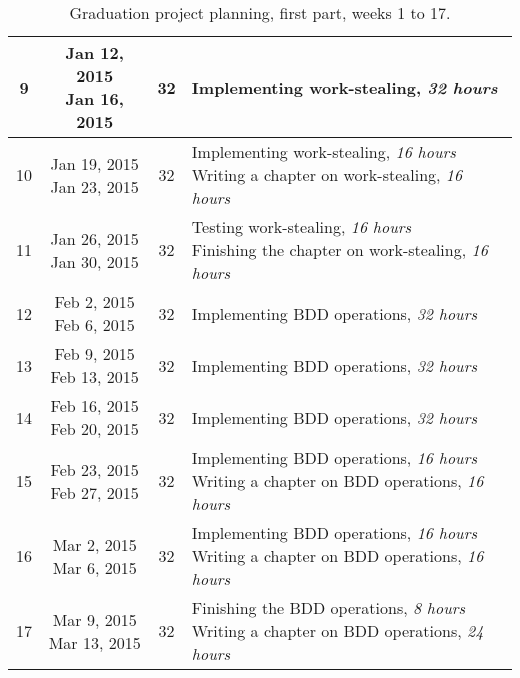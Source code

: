 \begin{table}[ht]
\begin{adjustwidth}{-.5in}{-.5in}
\begin{tabular}{| c | c | c | l |}
		9 & \specialcell{Jan 12, 2015\\Jan 16, 2015} & 32 & Implementing work-stealing, \textit{32 hours} \\ \hline
		10 & \specialcell{Jan 19, 2015\\Jan 23, 2015} & 32 & \specialcell{Implementing work-stealing, \textit{16 hours}\\Writing a chapter on work-stealing, \textit{16 hours}} \\ \hline
		11 & \specialcell{Jan 26, 2015\\Jan 30, 2015} & 32 & \specialcell{Testing work-stealing, \textit{16 hours}\\Finishing the chapter on work-stealing, \textit{16 hours}} \\ \hline \hline

		12 & \specialcell{Feb 2, 2015\\Feb 6, 2015} & 32 & Implementing BDD operations, \textit{32 hours} \\ \hline
		13 & \specialcell{Feb 9, 2015\\Feb 13, 2015} & 32 & Implementing BDD operations, \textit{32 hours} \\ \hline
		14 & \specialcell{Feb 16, 2015\\Feb 20, 2015} & 32 & Implementing BDD operations, \textit{32 hours} \\ \hline
		15 & \specialcell{Feb 23, 2015\\Feb 27, 2015} &32 & \specialcell{Implementing BDD operations, \textit{16 hours}\\Writing a chapter on BDD operations, \textit{16 hours}} \\ \hline
		16 & \specialcell{Mar 2, 2015\\Mar 6, 2015} & 32 & \specialcell{Implementing BDD operations, \textit{16 hours}\\Writing a chapter on BDD operations, \textit{16 hours}} \\ \hline
		17 & \specialcell{Mar 9, 2015\\Mar 13, 2015} & 32 & \specialcell{Finishing the BDD operations, \textit{8 hours}\\Writing a chapter on BDD operations, \textit{24 hours}} \\ \hline
	\end{tabular}
	\end{adjustwidth}
	\caption{Graduation project planning, first part, weeks 1 to 17.}
	\label{tab:planning1}
\end{table}


